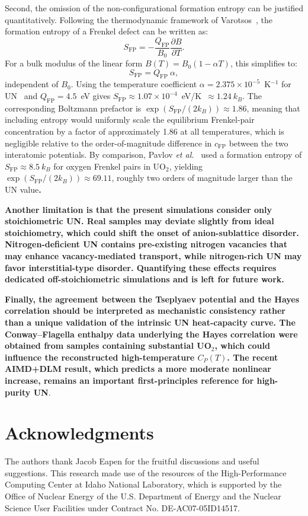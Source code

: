 \documentclass[preprint,12pt,sort&compress]{elsarticle}
\newcommand{\?}{\stackrel{?}{=}}
\providecommand{\DIFaddtex}[1]{{\bf #1}} %
\providecommand{\DIFaddbegin}{\protect\color{blue}} %
\providecommand{\DIFaddend}{\protect\color{black}} %
\providecommand{\DIFadd}[1]{\texorpdfstring{\DIFaddtex{#1}}{#1}} %
\newcommand{\DIFaddincludegraphics}[2][]{{\color{blue}\fbox{\DIFOincludegraphics[#1]{#2}}}} %
\DeclareRobustCommand{\DIFaddbegin}{\DIFOaddbegin \let\includegraphics\DIFaddincludegraphics} %
\DeclareRobustCommand{\DIFaddend}{\DIFOaddend \let\includegraphics\DIFOincludegraphics} %
\begin{document}
Second, the omission of the non-configurational formation entropy can be justified quantitatively. Following the thermodynamic framework of Varotsos~\cite{Varotsos1976}, the formation entropy of a Frenkel defect can be written as:
\begin{equation}
S_\text{FP} = -\frac{Q_\text{FP}}{B_0}\frac{\partial B}{\partial T}.
\label{Eq:S_F}
\end{equation}
For a bulk modulus of the linear form $B(T) = B_0(1 - \alpha T)$, this simplifies to:
\begin{equation}
S_\text{FP} = Q_\text{FP} \ \alpha,
\end{equation}
independent of $B_0$. Using the temperature coefficient $\alpha = 2.375\times10^{-5}$~K$^{-1}$ for UN~\cite{Hayes1990II} and $Q_\text{FP} = 4.5$~eV gives $S_\text{FP} \approx 1.07\times10^{-4}$~eV/K~$\approx 1.24 \ k_B$. The corresponding Boltzmann prefactor is $\exp(S_\text{FP}/(2k_B)) \approx 1.86$, meaning that including entropy would uniformly scale the equilibrium Frenkel-pair concentration by a factor of approximately 1.86 at all temperatures, which is negligible relative to the order-of-magnitude difference in $c_\text{FP}$ between the two interatomic potentials. By comparison, Pavlov \textit{et al.}~\cite{Pavlov2017} used a formation entropy of $S_\text{FP} \approx 8.5 \ k_B$ for oxygen Frenkel pairs in UO$_2$, yielding $\exp(S_\text{FP}/(2k_B)) \approx 69.11$, roughly two orders of magnitude larger than the UN value\DIFaddbegin \DIFadd{.
}

\DIFadd{Another limitation is that the present simulations consider only stoichiometric UN. Real samples may deviate slightly from ideal stoichiometry, which could shift the onset of anion-sublattice disorder. Nitrogen-deficient UN contains pre-existing nitrogen vacancies that may enhance vacancy-mediated transport, while nitrogen-rich UN may favor interstitial-type disorder. Quantifying these effects requires dedicated off-stoichiometric simulations and is left for future work.
}

\DIFadd{Finally, the agreement between the Tseplyaev potential and the Hayes correlation should be interpreted as mechanistic consistency rather than a unique validation of the intrinsic UN heat-capacity curve. The Conway--Flagella enthalpy data underlying the Hayes correlation were obtained from samples containing substantial UO$_2$, which could influence the reconstructed high-temperature $C_P(T)$. The recent AIMD+DLM result, which predicts a more moderate nonlinear increase, remains an important first-principles reference for high-purity UN}\DIFaddend .

\section*{Acknowledgments}

The authors thank Jacob Eapen for the fruitful discussions and useful suggestions. This research made use of the resources of the High-Performance Computing Center at Idaho National Laboratory, which is supported by the Office of Nuclear Energy of the U.S. Department of Energy and the Nuclear Science User Facilities under Contract No. DE-AC07-05ID14517.



\end{document}
